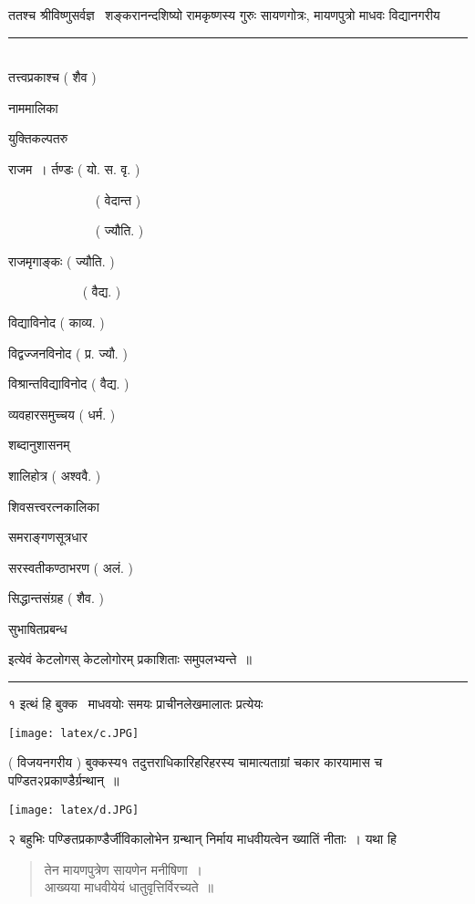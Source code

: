 \documentclass[11pt, openany]{book}
\begin{document}
\begin{multicols}{2}
ततश्च श्रीविष्णुसर्वज्ञ \textendash\ शङ्करानन्दशिष्यो रामकृष्णस्य गुरुः सायणगोत्रः, मायणपुत्रो माधवः विद्यानगरीय 

\noindent
\rule{1\linewidth}{0.5pt}\\

तत्त्वप्रकाश्च ( शैव ) 

नाममालिका 

युक्तिकल्पतरु 

राजम~। र्तण्डः ( यो. स. वृ. ) 

~~~~~~~~~~~~~ ( वेदान्त ) 

~~~~~~~~~~~~~ ( ज्यौति. ) 

राजमृगाङ्कः ( ज्यौति. ) 

~~~~~~~~~~~ ( वैद्य. ) 

विद्याविनोद ( काव्य. ) 

विद्वज्जनविनोद ( प्र. ज्यौ. ) 

विश्रान्तविद्याविनोद ( वैद्य. ) 

व्यवहारसमुच्चय ( धर्म. ) 

शब्दानुशासनम् 

शालिहोत्र ( अश्ववै. ) 

शिवसत्त्वरत्नकालिका 

समराङ्गणसूत्रधार 

सरस्वतीकण्ठाभरण ( अलं. ) 

सिद्धान्तसंग्रह ( शैव. ) 

सुभाषितप्रबन्ध 

इत्येवं केटलोगस् केटलोगोरम् प्रकाशिताः समुपलभ्यन्ते~॥ 

\begin{center}
\rule{0.2\linewidth}{0.5pt}
\end{center}

१ इत्थं हि बुक्क \textendash\ माधवयोः समयः प्राचीनलेखमालातः प्रत्येयः \textendash\

\texttt{[image: latex/c.JPG]}

\columnbreak

\noindent
 ( विजयनगरीय ) बुक्कस्य१ तदुत्तराधिकारिहरिहरस्य चामात्यताग्रां चकार कारयामास च पण्डित२प्रकाण्डैर्ग्रन्थान्~॥ 

\texttt{[image: latex/d.JPG]}

२ बहुभिः पण्ङितप्रकाण्डैर्जीविकालोभेन ग्रन्थान् निर्माय माधवीयत्वेन ख्यातिं नीताः~। यथा हि \textendash\

\begin{quote}
{\qt तेन मायणपुत्रेण सायणेन मनीषिणा~।\\
आख्यया माधवीयेयं धातुवृत्तिर्विरच्यते~॥ 

}
\end{quote}
\end{multicols}
\end{document}
